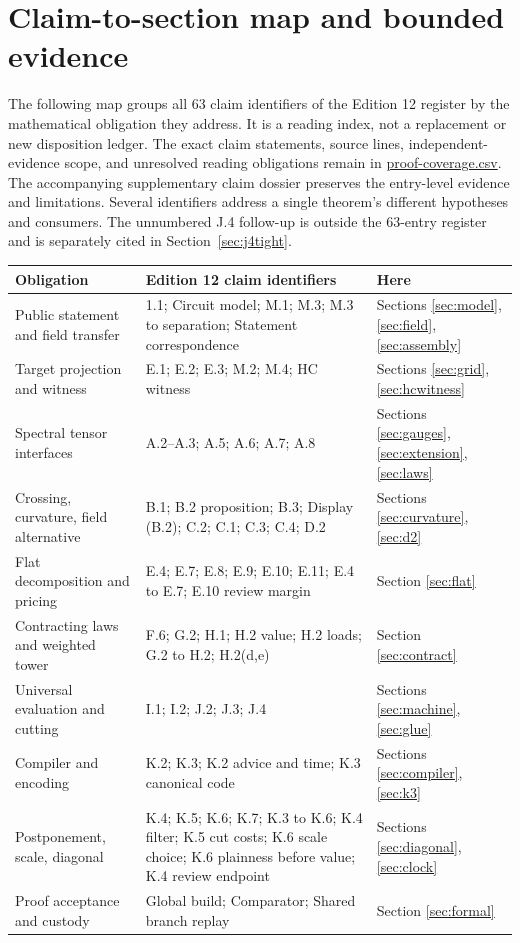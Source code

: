 \documentclass[11pt,letterpaper]{article}
\theoremstyle{definition}\newtheorem{definition}[theorem]{Definition}\newtheorem{example}[theorem]{Example}
\theoremstyle{remark}\newtheorem{remark}[theorem]{Remark}
\newcommand{\aud}[2]{\href{https://github.com/nousentllc/VP-VNP-Review/blob/567303d0bcf4f9d54390437b137752446e58ccd6/#1}{#2}}
\begin{document}
\section{Claim-to-section map and bounded evidence}\label{app:matrix}
The following map groups all 63 claim identifiers of the Edition 12 register by the mathematical obligation they address. It is a reading index, not a replacement or new disposition ledger. The exact claim statements, source lines, independent-evidence scope, and unresolved reading obligations remain in \aud{report/proof-coverage.csv}{proof-coverage.csv}. The accompanying supplementary claim dossier preserves the entry-level evidence and limitations. Several identifiers address a single theorem's different hypotheses and consumers. The unnumbered J.4 follow-up is outside the 63-entry register and is separately cited in Section~\ref{sec:j4tight}.
\small
\begin{longtable}{@{}p{.23\linewidth}p{.46\linewidth}p{.23\linewidth}@{}}
\toprule
Obligation & Edition 12 claim identifiers & Here \\\midrule\endhead
Public statement and field transfer & 1.1; Circuit model; M.1; M.3; M.3 to separation; Statement correspondence & Sections \ref{sec:model}, \ref{sec:field}, \ref{sec:assembly}\\[3pt]
Target projection and witness & E.1; E.2; E.3; M.2; M.4; HC witness & Sections \ref{sec:grid}, \ref{sec:hcwitness}\\[3pt]
Spectral tensor interfaces & A.2--A.3; A.5; A.6; A.7; A.8 & Sections \ref{sec:gauges}, \ref{sec:extension}, \ref{sec:laws}\\[3pt]
Crossing, curvature, field alternative & B.1; B.2 proposition; B.3; Display (B.2); C.2; C.1; C.3; C.4; D.2 & Sections \ref{sec:curvature}, \ref{sec:d2}\\[3pt]
Flat decomposition and pricing & E.4; E.7; E.8; E.9; E.10; E.11; E.4 to E.7; E.10 review margin & Section \ref{sec:flat}\\[3pt]
Contracting laws and weighted tower & F.6; G.2; H.1; H.2 value; H.2 loads; G.2 to H.2; H.2(d,e) & Section \ref{sec:contract}\\[3pt]
Universal evaluation and cutting & I.1; I.2; J.2; J.3; J.4 & Sections \ref{sec:machine}, \ref{sec:glue}\\[3pt]
Compiler and encoding & K.2; K.3; K.2 advice and time; K.3 canonical code & Sections \ref{sec:compiler}, \ref{sec:k3}\\[3pt]
Postponement, scale, diagonal & K.4; K.5; K.6; K.7; K.3 to K.6; K.4 filter; K.5 cut costs; K.6 scale choice; K.6 plainness before value; K.4 review endpoint & Sections \ref{sec:diagonal}, \ref{sec:clock}\\[3pt]
Proof acceptance and custody & Global build; Comparator; Shared branch replay & Section \ref{sec:formal}\\
\bottomrule
\end{longtable}
\normalsize
\end{document}
